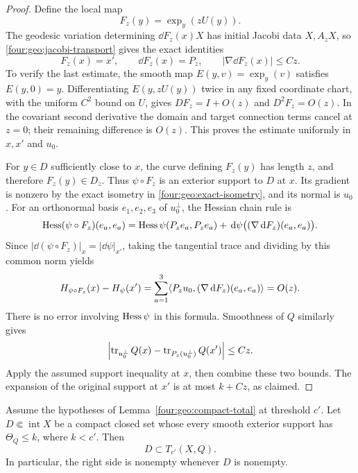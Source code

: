 \begin{proof}
Define the local map
\[
 F_z(y)=\exp_y(zU(y)).
\]
The geodesic variation determining $\dd F_z(x)X$ has initial Jacobi data
$X,A_zX$, so \eqref{four:geo:jacobi-transport} gives the exact identities
\begin{equation}\label{four:geo:exact-isometry}
 F_z(x)=x',\qquad \dd F_z(x)=P_z,
 \qquad |\nabla\dd F_z(x)|\le Cz.
\end{equation}
To verify the last estimate, the smooth map $E(y,v)=\exp_y(v)$ satisfies
$E(y,0)=y$.  Differentiating $E(y,zU(y))$ twice in any fixed coordinate
chart, with the uniform $C^2$ bound on $U$, gives
$D F_z=I+O(z)$ and $D^2F_z=O(z)$.  In the covariant second derivative the
domain and target connection terms cancel at $z=0$; their remaining
difference is $O(z)$.  This proves the estimate uniformly in $x,x'$ and
$u_0$.

For $y\in D$ sufficiently close to $x$, the curve defining $F_z(y)$ has
length $z$, and therefore $F_z(y)\in D_z$.  Thus $\psi\circ F_z$ is an
exterior support to $D$ at $x$.  Its gradient is nonzero by the exact
isometry in \eqref{four:geo:exact-isometry}, and its normal is $u_0$.  For an
orthonormal basis $e_1,e_2,e_3$ of $u_0^\perp$, the Hessian chain rule is
\[
 \operatorname{Hess}(\psi\circ F_z)(e_a,e_a)
 =\operatorname{Hess}\psi(P_ze_a,P_ze_a)
   +\,\mathrm d\psi\bigl((\nabla\,\mathrm d F_z)(e_a,e_a)\bigr).
\]
Since $|\dd(\psi\circ F_z)|_x=|\dd\psi|_{x'}$, taking the tangential
trace and dividing by this common norm yields
\begin{equation}\label{four:geo:mean-curvature-transport}
 H_{\psi\circ F_z}(x)-H_\psi(x')
 =\sum_{a=1}^3
   \langle P_zu_0,(\nabla\,\mathrm d F_z)(e_a,e_a)\rangle=O(z).
\end{equation}
There is no error involving $\operatorname{Hess}\psi$ in this formula.  Smoothness of
$Q$ similarly gives
\[
 \left|\operatorname{tr}_{u_0^\perp}Q(x)
       -\operatorname{tr}_{P_z(u_0^\perp)}Q(x')\right|\le Cz.
\]
Apply the assumed support inequality at $x$, then combine these two bounds.
The expansion of the original support at $x'$ is at most $k+Cz$, as claimed.
\end{proof}

\begin{lemma}\label{four:lem:support-enclosure}
Assume the hypotheses of Lemma~\ref{four:geo:compact-total} at threshold $c'$.
Let $D\Subset\operatorname{int}X$ be a compact closed set whose every
smooth exterior support has $\Theta_Q\le k$, where $k<c'$.  Then
\[
 D\subset T_{c'}(X,Q).
\]
In particular, the right side is nonempty whenever $D$ is nonempty.
\end{lemma}

